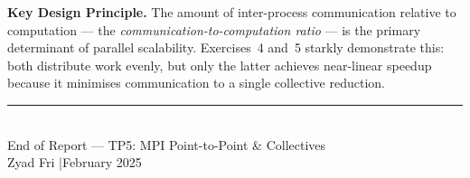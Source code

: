 \documentclass[12pt,a4paper]{article}
\begin{document}
\vspace{1em}

\noindent
\textbf{Key Design Principle.}
The amount of inter-process communication relative to computation
— the \emph{communication-to-computation ratio} — is the primary
determinant of parallel scalability.
Exercises~4 and~5 starkly demonstrate this: both distribute work evenly,
but only the latter achieves near-linear speedup because it minimises
communication to a single collective reduction.

\vspace{1.5em}
\begin{center}
  {\color{rulegray}\rule{0.8\linewidth}{0.5pt}}\\[0.5em]
  {\small\color{rulegray} End of Report — TP5: MPI Point-to-Point \& Collectives}\\
  {\small\color{rulegray} Zyad Fri \quad|\quad February 2025}
\end{center}
\end{document}
